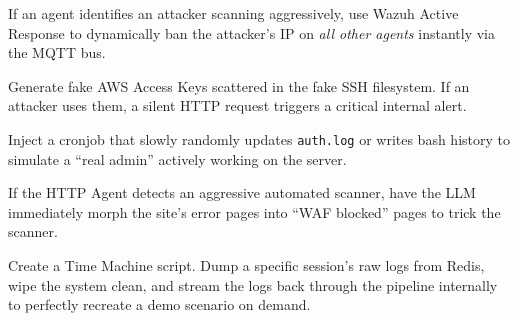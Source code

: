 \documentclass[11pt,a4paper]{article}
\begin{document}
\begin{tcolorbox}[title=\textbf{1. Auto-Network Blackhole (Active Response)}, colframe=primary]
If an agent identifies an attacker scanning aggressively, use Wazuh Active Response to dynamically ban the attacker's IP on \textit{all other agents} instantly via the MQTT bus.
\end{tcolorbox}

\begin{tcolorbox}[title=\textbf{2. Honeytoken Beacons}, colframe=primary]
Generate fake AWS Access Keys scattered in the fake SSH filesystem. If an attacker uses them, a silent HTTP request triggers a critical internal alert.
\end{tcolorbox}

\begin{tcolorbox}[title=\textbf{3. Simulated ``Human Noise'' (Ghost Activity)}, colframe=primary]
Inject a cronjob that slowly randomly updates \texttt{auth.log} or writes bash history to simulate a ``real admin'' actively working on the server.
\end{tcolorbox}

\begin{tcolorbox}[title=\textbf{4. Adaptive Persona Shifting}, colframe=primary]
If the HTTP Agent detects an aggressive automated scanner, have the LLM immediately morph the site's error pages into ``WAF blocked'' pages to trick the scanner.
\end{tcolorbox}

\begin{tcolorbox}[title=\textbf{5. Teardown \& Replay Architecture}, colframe=primary]
Create a Time Machine script. Dump a specific session’s raw logs from Redis, wipe the system clean, and stream the logs back through the pipeline internally to perfectly recreate a demo scenario on demand.
\end{tcolorbox}
\end{document}
